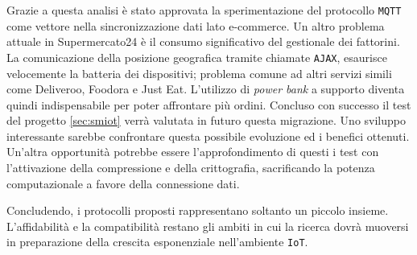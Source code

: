 Grazie a questa analisi è stato approvata la sperimentazione del protocollo \verb+MQTT+ come vettore nella sincronizzazione dati lato e-commerce.
Un altro problema attuale in Supermercato24 è il consumo significativo del gestionale dei fattorini.
La comunicazione della posizione geografica tramite chiamate \verb+AJAX+, esaurisce velocemente la batteria dei dispositivi; problema comune ad altri servizi simili come Deliveroo, Foodora e Just Eat.
L'utilizzo di \textit{power bank} a supporto diventa quindi indispensabile per poter affrontare più ordini.
Concluso con successo il test del progetto \ref{sec:smiot} verrà valutata in futuro questa migrazione.
Uno sviluppo interessante sarebbe confrontare questa possibile evoluzione ed i benefici ottenuti.
Un'altra opportunità potrebbe essere l'approfondimento di questi i test con l'attivazione della compressione e della crittografia, sacrificando la potenza computazionale a favore della connessione dati.

Concludendo, i protocolli proposti rappresentano soltanto un piccolo insieme.
L'affidabilità e la compatibilità restano gli ambiti in cui la ricerca dovrà muoversi in preparazione della crescita esponenziale nell'ambiente \verb+IoT+.
